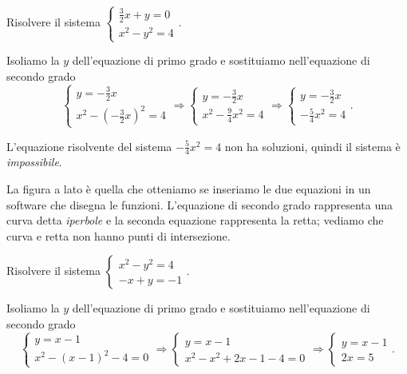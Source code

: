 \begin{exrig}
\begin{esempio}
Risolvere il sistema $\left\{\begin{array}{l}\frac 3 2x+y=0\\x^2-y^2=4\end{array}\right..$

Isoliamo la $y$ dell'equazione di primo grado e sostituiamo nell'equazione di secondo grado 
\[\left\{\begin{array}{l}y=-\frac 3 2x \\
x^2-\left(-\frac 3 2x\right)^2=4\end{array}\right.
\Rightarrow \left\{\begin{array}{l}y=-\frac 3 2x \\
x^2-\frac 9 4x^2=4\end{array}\right.
\Rightarrow \left\{\begin{array}{l}y=-\frac 3 2x\\
-\frac 5 4x^2=4\end{array}\right..\]

L'equazione risolvente del sistema $-\frac 5 4x^2=4$ non ha soluzioni, quindi il sistema è \emph{impossibile}.
\begin{multicols}{2}
La figura a lato è quella che otteniamo se inseriamo le due equazioni in un software che disegna le funzioni. L'equazione di secondo grado rappresenta una curva detta \emph{iperbole} e la seconda equazione rappresenta la retta; vediamo che curva e retta non hanno punti di intersezione.
\begin{center}

\end{center}
\end{multicols}
\end{esempio}

\begin{esempio}
Risolvere il sistema $\left\{\begin{array}{l}x^2-y^2=4\\-x+y=-1\end{array}\right.$.

Isoliamo la $y$ dell'equazione di primo grado e sostituiamo nell'equazione di secondo grado 
\[\left\{\begin{array}{l}y=x-1 \\
x^2-(x-1)^2-4=0\end{array}\right.
\Rightarrow \left\{\begin{array}{l}y=x-1 \\
x^2-x^2+2x-1-4=0\end{array}\right.
\Rightarrow \left\{\begin{array}{l}y=x-1\\2x=5\end{array}\right..\]


\end{esempio}
\end{exrig}
